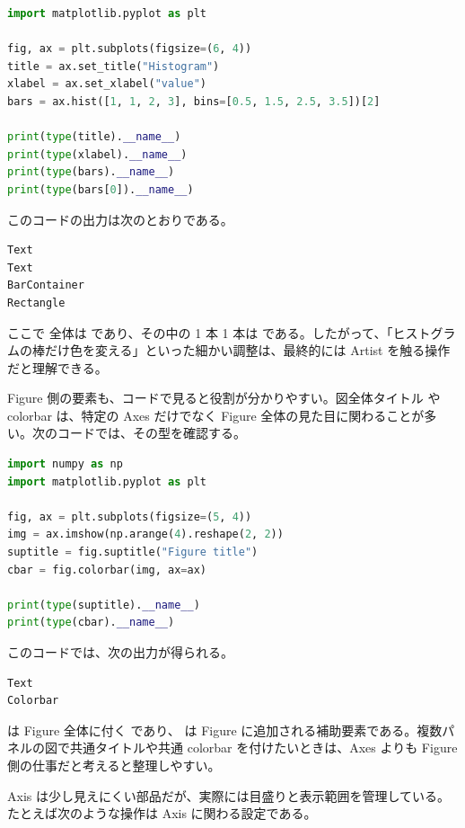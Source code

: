 \begin{lstlisting}[language=Python]
import matplotlib.pyplot as plt

fig, ax = plt.subplots(figsize=(6, 4))
title = ax.set_title("Histogram")
xlabel = ax.set_xlabel("value")
bars = ax.hist([1, 1, 2, 3], bins=[0.5, 1.5, 2.5, 3.5])[2]

print(type(title).__name__)
print(type(xlabel).__name__)
print(type(bars).__name__)
print(type(bars[0]).__name__)
\end{lstlisting}

\noindent このコードの出力は次のとおりである。

\begin{lstlisting}[numbers=none, xleftmargin=2\zw]
Text
Text
BarContainer
Rectangle
\end{lstlisting}

ここで  全体は  であり、その中の 1 本 1 本は  である。したがって、「ヒストグラムの棒だけ色を変える」といった細かい調整は、最終的には Artist を触る操作だと理解できる。

Figure 側の要素も、コードで見ると役割が分かりやすい。図全体タイトル  や colorbar は、特定の Axes だけでなく Figure 全体の見た目に関わることが多い。次のコードでは、その型を確認する。

\begin{lstlisting}[language=Python]
import numpy as np
import matplotlib.pyplot as plt

fig, ax = plt.subplots(figsize=(5, 4))
img = ax.imshow(np.arange(4).reshape(2, 2))
suptitle = fig.suptitle("Figure title")
cbar = fig.colorbar(img, ax=ax)

print(type(suptitle).__name__)
print(type(cbar).__name__)
\end{lstlisting}

\noindent このコードでは、次の出力が得られる。

\begin{lstlisting}[numbers=none, xleftmargin=2\zw]
Text
Colorbar
\end{lstlisting}

 は Figure 全体に付く  であり、 は Figure に追加される補助要素である。複数パネルの図で共通タイトルや共通 colorbar を付けたいときは、Axes よりも Figure 側の仕事だと考えると整理しやすい。

Axis は少し見えにくい部品だが、実際には目盛りと表示範囲を管理している。たとえば次のような操作は Axis に関わる設定である。

